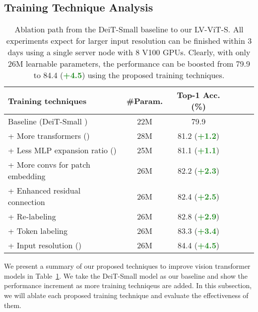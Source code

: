 \documentclass[10pt,twocolumn,letterpaper]{article}
\newcommand{\nameofmethod}{LV-ViT}
\begin{document}
\subsection{Training Technique Analysis} \label{sec:ablation}
\begin{table}[t]
  \centering
  \small
  \setlength\tabcolsep{1mm}
  \renewcommand\arraystretch{1}
  \caption{Ablation path from the DeiT-Small \cite{touvron2020training} baseline to our \nameofmethod{}-S.
  All experiments expect for larger input resolution can be finished within 3 days using a single server node
  with 8 V100 GPUs. Clearly, with only 26M learnable parameters, the performance can be boosted from 79.9
  to 84.4 (\textcolor{ForestGreen}{\textbf{+4.5}}) using the proposed training techniques.}
  \label{tab:tricks}
  \begin{tabular}{lccccc} \toprule[0.5pt]
    Training techniques & \#Param. & Top-1 Acc. (\%) \\ \midrule[0.5pt] \midrule[0.5pt]
    Baseline (DeiT-Small \cite{touvron2020training}) &22M &  79.9\\
    + More transformers () & 28M & 81.2 (\textcolor{ForestGreen}{\textbf{+1.2}}) \\
    + Less MLP expansion ratio () & 25M & 81.1 (\textcolor{ForestGreen}{\textbf{+1.1}})\\
    + More convs for patch embedding &26M& 82.2  (\textcolor{ForestGreen}{\textbf{+2.3}})\\
    + Enhanced residual connection &26M& 82.4
    (\textcolor{ForestGreen}{\textbf{+2.5}}) \\

    + Re-labeling &26M& 82.8 (\textcolor{ForestGreen}{\textbf{+2.9}})\\
    + Token labeling &26M & 83.3
    (\textcolor{ForestGreen}{\textbf{+3.4}})\\
    + Input resolution () & 26M & 84.4 (\textcolor{ForestGreen}{\textbf{+4.5}})\\
    \bottomrule[0.5pt]
  \end{tabular}
\end{table}

We present a summary of our proposed techniques to improve vision transformer models in Table~\ref{tab:tricks}.
We take the DeiT-Small \cite{touvron2020training} model as our baseline and show the performance increment
as more training techniqeus are added.
In this subsection, we will ablate each proposed training technique and 
evaluate the effectiveness of them. 
\end{document}
